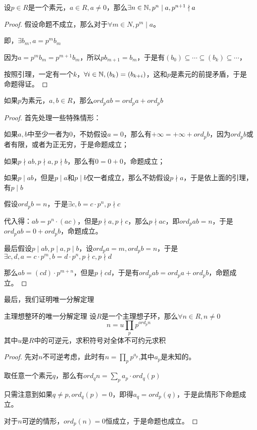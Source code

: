 \documentclass[12pt, a4paper, oneside, UTF8]{ctexbook}
\begin{document}
			\begin{lemma}{}{}
				设$p \in R$是一个素元，$a \in R,a \neq 0$，那么$\exists n \in \mathbb{N},p^n \mid a,p^{n+1}\nmid a$
			\end{lemma}
			\begin{proof}
				假设命题不成立，那么对于$\forall m \in N,p^m \mid a$。
				
				即，$\exists b_m,a = p^m b_m$
				
				因为$a = p^m b_m=p^{m+1} b_m$，所以$p b_{m+1} = b_m$，于是有$(b_0) \subseteq \cdots \subseteq (b_k) \subseteq \cdots$，
				
				按照引理，一定有一个$k$，$\forall i \in \mathbb{N},(b_k)=(b_{k+i})$，这和$p$是素元的前提矛盾，于是命题得证。
			\end{proof}
				\begin{lemma}{}{}
				如果$p$为素元，$a,b\in R$，那么$ord_p ab=ord_p a + ord_p b$
			\end{lemma}
			\begin{proof}
				首先处理一些特殊情形：
				
				如果$a,b$中至少一者为$0$，不妨假设$a=0$，那么有$+\infty = +\infty + ord_p b$，因为$ord_p b$或者有限，或者为正无穷，于是命题成立；
				
				如果$p \nmid ab,p\nmid a,p\nmid b$，那么有$0=0+0$，命题成立；
				
				如果$p \mid ab$，但是$p \mid a$和$p \mid b$仅一者成立，那么不妨假设$p \nmid a$，于是依上面的引理，有$p \mid b$
				
				假设$ord_p b = n$，于是$\exists c,b=c\cdot p^n,p \nmid c$
				
				代入得：$ab=p^n\cdot (ac)$，但是$p \nmid a,p\nmid c$，那么$p \nmid ac$，即$ord_p ab=n$，于是$ord_p ab = 0+ ord_p b$，命题成立。
				
				最后假设$p \mid ab,p \mid a,p \mid b$，设$ord_p a = m,ord_p b = n$，于是$\exists c,d,a = c\cdot p^m,b=d\cdot p^n,p \nmid c,p\nmid d$
				
				那么$ab=(cd)\cdot p^{m+n}$，但是$p \nmid cd$，于是有$ord_p ab=ord_p a + ord_p b$，命题成立。
			\end{proof}
			最后，我们证明唯一分解定理
			\begin{them}{主理想整环的唯一分解定理}{}
				设$R$是一个主理想子环，那么$\forall n \in R,n \neq 0$
				\begin{equation}
					n = u \prod_{p} p^{ord_p n}
				\end{equation}
				其中$u$是$R$中的可逆元，求积符号对全体不可约元求积
			\end{them}
			\begin{proof}
				先对$n$不可逆考虑，此时有$n=\prod_{p} p^{a_p}$,其中$a_p$是未知的。
				
				取任意一个素元$q$，那么有$ord_q n=\sum\limits_{p} a_p\cdot ord_q (p)$
				
				只需注意到如果$q \neq p,ord_q (p)=0$，即得$a_q = ord_p (q)$，于是此情形下命题成立。
				
				对于$n$可逆的情形，$ord_p (n)=0$恒成立，于是命题也成立。
			\end{proof}
\end{document}
